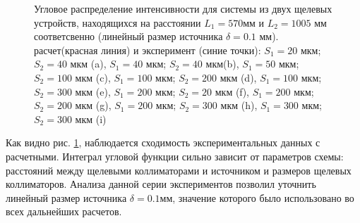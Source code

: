 \begin{figure}[H]
  \hfill
  \hfill
  \hfill
  \caption{Угловое распределение интенсивности для системы из двух щелевых устройств, находящихся
  на расстоянии $L_1= 570 $мм и $L_2 = 1005$ мм соответсвенно (линейный размер источника $\delta = 0.1$ мм).
  расчет(красная линия) и эксперимент (синие точки):
  $S_1 = 20$ мкм; $S_2 = 40$ мкм (a),
  $S_1 = 40$ мкм; $S_2 = 40$ мкм(b), $S_1 = 50$ мкм; $S_2 = 100$ мкм (c),
   $S_1 = 100$ мкм; $S_2 = 200$ мкм (d),  $S_1 = 100$ мкм; $S_2 = 300$ мкм (e),
    $S_1 = 200$ мкм; $S_2 = 20$ мкм (f),  $S_1 = 200$ мкм; $S_2 = 200$ мкм (g),
    $S_1 = 200$ мкм; $S_2 = 300$ мкм (h),  $S_1 = 300$ мкм; $S_2 = 300$ мкм (i)}
  \label{ris:zero_exp}
\end{figure}

Как видно рис. \ref{ris:zero_exp}, наблюдается сходимость экспериментальных данных с расчетными.
Интеграл угловой функции сильно зависит от параметров схемы: расстояний между щелевыми коллиматорами и источником и
размеров щелевых коллиматоров. Анализа данной серии экспериментов позволил уточнить линейный размер источника $\delta = 0.1$мм,
значение которого было использовано во всех дальнейших расчетов.
